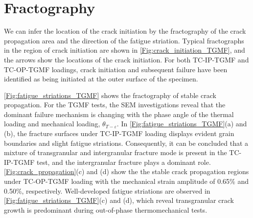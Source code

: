 \section{Fractography}
\noindent
We can infer the location of the crack initiation by the fractography of the crack propagation area and the direction of the fatigue striation. 
Typical fractographs in the region of crack initiation are shown in \ref{Fig:crack_initiation_TGMF}, and the arrows show the locations of the crack initiation. For both TC-IP-TGMF and TC-OP-TGMF loadings, crack initiation and subsequent failure have been identified as being initiated at the outer surface of the specimen.

\ref{Fig:fatigue_striations_TGMF} shows the fractography of stable crack propagation.
For the TGMF tests, the SEM investigations reveal that the dominant failure mechanism is changing with the phase angle of the thermal loading and mechanical loading, $\theta_{T-\varepsilon}$.
In \ref{Fig:fatigue_striations_TGMF}(a) and (b), the fracture surfaces under TC-IP-TGMF loading displays evident grain boundaries and slight fatigue striations. Consequently, it can be concluded that a mixture of transgranular and intergranular fracture mode is present in the TC-IP-TGMF test, and the intergranular fracture plays a dominant role.
\ref{Fig:crack_propagation}(c) and (d) show the the stable crack propagation regions under TC-OP-TGMF loading with the mechanical strain amplitude of 0.65\% and 0.50\%, respectively.
Well-developed fatigue striations are observed in \ref{Fig:fatigue_striations_TGMF}(c) and (d), which reveal transgranular crack growth is predominant during out-of-phase thermomechanical tests.


